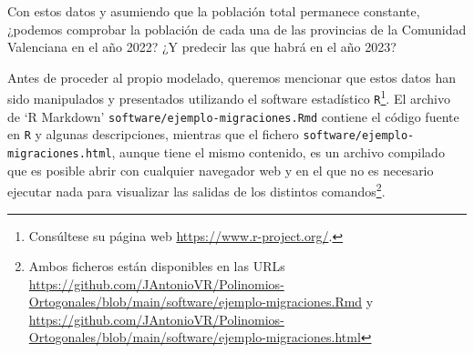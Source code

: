 \begin{ejemplo}
        Con estos datos y asumiendo que la población total permanece constante, ¿podemos comprobar la población de cada una de las provincias de la Comunidad Valenciana en el año 2022? ¿Y predecir las que habrá en el año 2023?

        Antes de proceder al propio modelado, queremos mencionar que estos datos han sido manipulados y presentados utilizando el software estadístico \texttt{R}\footnote{Consúltese su página web \url{https://www.r-project.org/}.}. El archivo de `R Markdown' \texttt{software/ejemplo-migraciones.Rmd} 
        contiene el código fuente en \texttt{R} y algunas descripciones, mientras que el fichero \texttt{software/ejemplo-migraciones.html}, aunque tiene el mismo contenido, es un archivo compilado que es posible abrir con cualquier navegador web y en el que no es necesario ejecutar nada para visualizar las salidas de los distintos comandos\footnote{Ambos ficheros están disponibles en las URLs \url{https://github.com/JAntonioVR/Polinomios-Ortogonales/blob/main/software/ejemplo-migraciones.Rmd} y \url{https://github.com/JAntonioVR/Polinomios-Ortogonales/blob/main/software/ejemplo-migraciones.html}}. 


\end{ejemplo}
